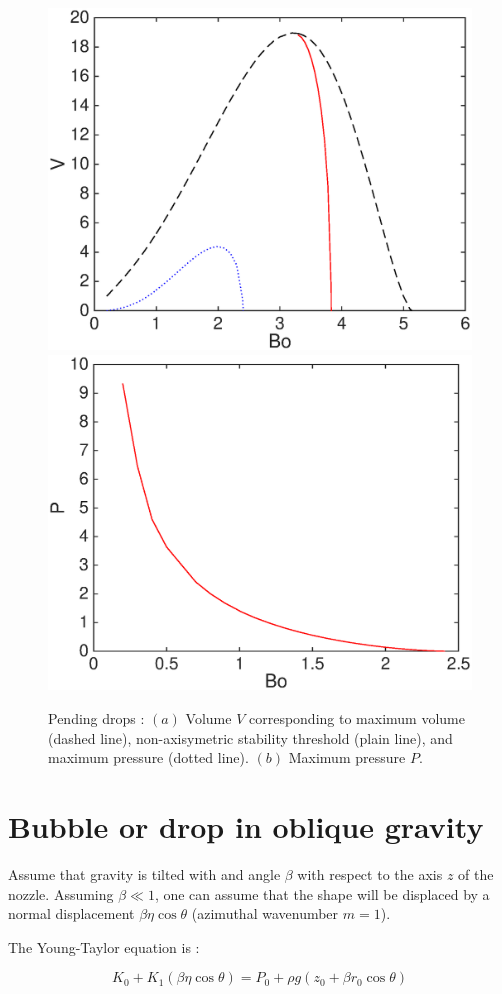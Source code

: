\documentclass{jfm}
\begin{document}
\begin{figure}
\includegraphics[width=.48\linewidth]{Pending_BoV.eps}
\includegraphics[width=.48\linewidth]{Pending_BoP.eps} 
\caption{
Pending drops : $(a)$ Volume $V$ corresponding to maximum volume (dashed line), 
non-axisymetric stability threshold (plain line), and maximum pressure (dotted line).
$(b)$ Maximum pressure $P$.
}
\label{fig:PendingBoV}
\end{figure}




            
            
            
\section{Bubble or drop in oblique gravity}

Assume that gravity is tilted with and angle $\beta$ with respect to the axis $z$ of the nozzle. Assuming $\beta \ll 1$, one can assume that the shape will be displaced by a normal displacement $\beta \eta \cos \theta$ (azimuthal wavenumber $m=1$).

The Young-Taylor equation is :

$$
K_0+ K_1( \beta \eta \cos \theta) = P_0 + \rho g (z_0 + \beta r_0 \cos \theta)
$$
\end{document}
